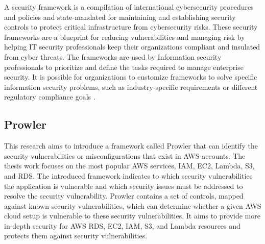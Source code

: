 {\par A security framework is a compilation of international cybersecurity procedures and policies and state-mandated for maintaining and establishing security controls to protect critical infrastructure from cybersecurity risks.
These security frameworks are a blueprint for reducing vulnerabilities and managing risk by helping IT security professionals keep their organizations compliant and insulated from cyber threats.
The frameworks are used by Information security professionals to prioritize and define the tasks required to manage enterprise security.
It is possible for organizations to customize frameworks to solve specific information security problems, such as industry-specific requirements or different regulatory compliance goals \cite{80}.

\subsection{Prowler}

\par This research aims to introduce a framework called Prowler that can identify the security vulnerabilities or misconfigurations that exist in AWS accounts.
The thesis work focuses on the most popular AWS services,
IAM,
EC2, Lambda, S3, and RDS.
The introduced framework indicates to which security vulnerabilities the application is vulnerable and which security issues must be addressed to resolve the security vulnerability.
Prowler contains a set of controls, mapped against known security vulnerabilities, which can determine whether a given AWS cloud setup is vulnerable to these security vulnerabilities.
It aims to provide more in-depth security for AWS RDS,
EC2, IAM, S3, and Lambda resources and protects them
against security vulnerabilities.\\

}

